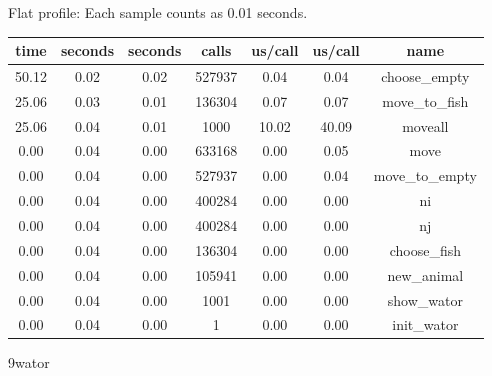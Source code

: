 \documentclass[a4paper,10pt]{article}
\begin{document}
Flat profile:
Each sample counts as 0.01 seconds.
\begin{center}
  \begin{tabular}{| c | c | c | c | c | c | c |}
    \hline
 time &   seconds &   seconds &    calls &  us/call &   us/call &   name \\ \hline    
 50.12 &      0.02 &     0.02 &   527937 &     0.04 &      0.04 &   choose\_empty \\ \hline
 25.06 &      0.03 &     0.01 &   136304 &     0.07 &      0.07 &   move\_to\_fish \\ \hline
 25.06 &      0.04 &     0.01 &     1000 &    10.02 &     40.09 &   moveall \\ \hline
  0.00 &      0.04 &     0.00 &   633168 &     0.00 &      0.05 &   move \\ \hline
  0.00 &      0.04 &     0.00 &   527937 &     0.00 &      0.04 &   move\_to\_empty \\ \hline
  0.00 &      0.04 &     0.00 &   400284 &     0.00 &      0.00 &   ni \\ \hline
  0.00 &      0.04 &     0.00 &   400284 &     0.00 &      0.00 &   nj \\ \hline
  0.00 &      0.04 &     0.00 &   136304 &     0.00 &      0.00 &   choose\_fish \\ \hline
  0.00 &      0.04 &     0.00 &   105941 &     0.00 &      0.00 &   new\_animal \\ \hline
  0.00 &      0.04 &     0.00 &     1001 &     0.00 &      0.00 &   show\_wator \\ \hline
  0.00 &      0.04 &     0.00 &        1 &     0.00 &      0.00 &   init\_wator \\ \hline
  \end{tabular}
\end{center}
  
9wator
\end{document}
